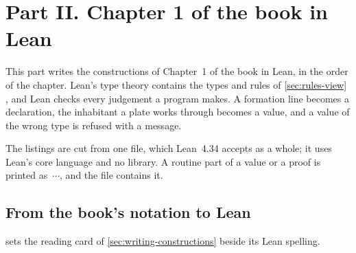 \chapter*{Part II. Chapter 1 of the book in Lean}
\label{sec:lean-view}

This part writes the constructions of Chapter~1 of the book in Lean, in the
order of the chapter. Lean's type theory contains the types and rules of
\cref{sec:rules-view} \cite{deMouraUllrich2021}, and Lean checks every
judgement a program makes. A formation line becomes a declaration, the
inhabitant a plate works through becomes a value, and a value of the wrong
type is refused with a message.

The listings are cut from one file, which Lean~4.34 accepts as a whole; it
uses Lean's core language and no library. A routine part of a value or a
proof is printed as~$\cdots$, and the file contains it.

\section*{From the book's notation to Lean}
\label{sec:lean-reading}

 sets the reading card of \cref{sec:writing-constructions}
beside its Lean spelling.

